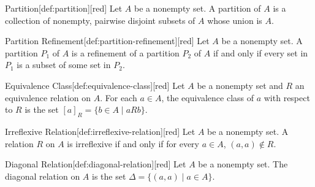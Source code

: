 \documentclass[10pt]{article}
\theoremstyle{definition}
\theoremstyle{plain}
\numberwithin{equation}{section}
\begin{document}
\begin{define}{Partition}[def:partition][red]
  Let $A$ be a nonempty set. A partition of $A$ is a collection of nonempty, pairwise disjoint subsets of $A$ whose union is $A$.
\end{define}

\begin{define}{Partition Refinement}[def:partition-refinement][red]
  Let $A$ be a nonempty set. A partition $P_1$ of $A$ is a refinement of a partition $P_2$ of $A$ if and only if every set in $P_1$ is a subset of some set in $P_2$.
\end{define}

\begin{define}{Equivalence Class}[def:equivalence-class][red]
  Let $A$ be a nonempty set and $R$ an equivalence relation on $A$. For each $a \in A$, the equivalence class of $a$ with respect to $R$ is the set $[a]_R = \{b \in A \mid a R b\}$.
\end{define}

\begin{define}{Irreflexive Relation}[def:irreflexive-relation][red]
  Let $A$ be a nonempty set. A relation $R$ on $A$ is irreflexive if and only if for every $a \in A$, $(a,a) \notin R$.
\end{define}

\begin{define}{Diagonal Relation}[def:diagonal-relation][red]
  Let $A$ be a nonempty set. The diagonal relation on $A$ is the set $\Delta = \{(a,a) \mid a \in A\}$.
\end{define}











  
\end{document}
